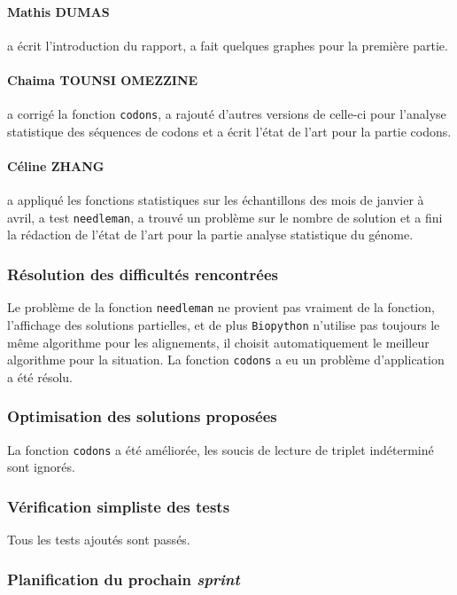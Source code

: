\paragraph*{Mathis DUMAS} a écrit l'introduction du rapport, a fait quelques graphes pour la première partie.

\paragraph*{Chaima TOUNSI OMEZZINE} a corrigé la fonction \texttt{codons}, a rajouté d'autres versions de celle-ci pour l'analyse statistique des séquences de codons et a écrit l'état de l'art pour la partie codons.

\paragraph*{Céline ZHANG} a appliqué les fonctions statistiques sur les échantillons des mois de janvier à avril, a test \texttt{needleman}, a trouvé un problème sur le nombre de solution et a fini la rédaction de l'état de l'art pour la partie analyse statistique du génome.

\subsubsection*{Résolution des difficultés rencontrées}
Le problème de la fonction \texttt{needleman} ne provient pas vraiment de la fonction, l'affichage des solutions partielles, et de plus \texttt{Biopython} n'utilise pas toujours le même algorithme pour les alignements, il choisit automatiquement le meilleur algorithme pour la situation. La fonction \texttt{codons} a eu un problème d'application a été résolu.


\subsubsection*{Optimisation des solutions proposées}
La fonction \texttt{codons} a été améliorée, les soucis de lecture de triplet indéterminé sont ignorés.

\subsubsection*{Vérification simpliste des tests}
Tous les tests ajoutés sont passés.

\subsubsection*{Planification du prochain \textsl{sprint}}
